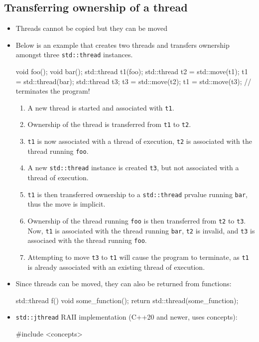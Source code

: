 \documentclass[11pt, a4paper]{article}
\theoremstyle{definition}
\theoremstyle{remark}
\newcommand{\code}[1]{\lstinline|#1|}
\begin{document}
\subsection{Transferring ownership of a thread}
\begin{itemize}
    \item Threads cannot be copied but they can be moved
    \item Below is an example that creates two threads and transfers ownership amongst three \code{std::thread} instances. 
\begin{cppcode}
void foo();
void bar();
std::thread t1(foo);
std::thread t2 = std::move(t1);
t1 = std::thread(bar);
std::thread t3;
t3 = std::move(t2);
t1 = std::move(t3); // terminates the program!
\end{cppcode}
    \begin{enumerate}
        \item A new thread is started and associated with \code{t1}. 
        \item Ownership of the thread is transferred from \code{t1} to \code{t2}.
        \item \code{t1} is now associated with a thread of execution, \code{t2} is associated with the thread running \code{foo}.
        \item A new \code{std::thread} instance is created \code{t3}, but not associated with a thread of execution.
        \item \code{t1} is then transferred ownership to a \code{std::thread} prvalue running \code{bar}, thus the move is implicit.
        \item Ownership of the thread running \code{foo} is then transferred from \code{t2} to \code{t3}. Now, \code{t1} is associated with the thread running \code{bar}, \code{t2} is invalid, and \code{t3} is associaed with the thread running \code{foo}.
        \item Attempting to move \code{t3} to \code{t1} will cause the program to terminate, as \code{t1} is already associated with an existing thread of execution.
    \end{enumerate}
    \item Since threads can be moved, they can also be returned from functions:
\begin{cppcode}
std::thread f() {
    void some_function();
    return std::thread(some_function);
}
\end{cppcode}
    \item \code{std::jthread} RAII implementation (C++20 and newer, uses concepts):
\begin{cppcode}
#include <concepts>


\end{cppcode}
\end{itemize}
\end{document}
